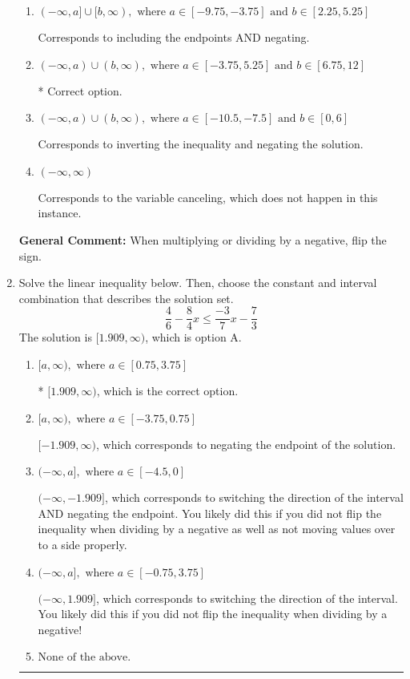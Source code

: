\documentclass{extbook}[14pt]
\newcommand{\litem}[1]{\item #1

\rule{\textwidth}{0.4pt}}
\begin{document}
\begin{enumerate}
{\begin{enumerate}[label=\Alph*.]
Corresponds to including the endpoints (when they should be excluded).
\item \( (-\infty, a] \cup [b, \infty), \text{ where } a \in [-9.75, -3.75] \text{ and } b \in [2.25, 5.25] \)

Corresponds to including the endpoints AND negating.
\item \( (-\infty, a) \cup (b, \infty), \text{ where } a \in [-3.75, 5.25] \text{ and } b \in [6.75, 12] \)

 * Correct option.
\item \( (-\infty, a) \cup (b, \infty), \text{ where } a \in [-10.5, -7.5] \text{ and } b \in [0, 6] \)

Corresponds to inverting the inequality and negating the solution.
\item \( (-\infty, \infty) \)

Corresponds to the variable canceling, which does not happen in this instance.
\end{enumerate}

\textbf{General Comment:} When multiplying or dividing by a negative, flip the sign.
}
\litem{
Solve the linear inequality below. Then, choose the constant and interval combination that describes the solution set.
\[ \frac{4}{6} - \frac{8}{4} x \leq \frac{-3}{7} x - \frac{7}{3} \]The solution is \( [1.909, \infty) \), which is option A.\begin{enumerate}[label=\Alph*.]
\item \( [a, \infty), \text{ where } a \in [0.75, 3.75] \)

* $[1.909, \infty)$, which is the correct option.
\item \( [a, \infty), \text{ where } a \in [-3.75, 0.75] \)

 $[-1.909, \infty)$, which corresponds to negating the endpoint of the solution.
\item \( (-\infty, a], \text{ where } a \in [-4.5, 0] \)

 $(-\infty, -1.909]$, which corresponds to switching the direction of the interval AND negating the endpoint. You likely did this if you did not flip the inequality when dividing by a negative as well as not moving values over to a side properly.
\item \( (-\infty, a], \text{ where } a \in [-0.75, 3.75] \)

 $(-\infty, 1.909]$, which corresponds to switching the direction of the interval. You likely did this if you did not flip the inequality when dividing by a negative!
\item \( \text{None of the above}. \)


\end{enumerate}}
\end{enumerate}
\end{document}
